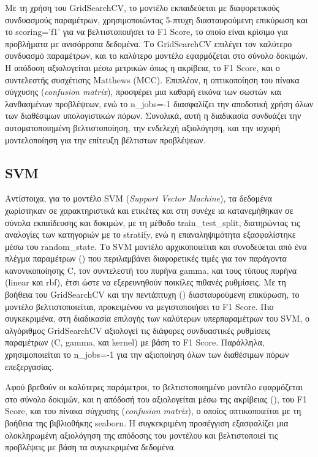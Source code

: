 \documentclass[diploma]{softlab-thesis}
\begin{document}
\begin{enumerate}
\begin{enumerate}
Με τη χρήση του GridSearchCV, το μοντέλο εκπαιδεύεται με διαφορετικούς συνδυασμούς παραμέτρων, χρησιμοποιώντας 5-πτυχη διασταυρούμενη επικύρωση και το scoring='f1' για να βελτιστοποιήσει το F1 Score, το οποίο είναι κρίσιμο για προβλήματα με ανισόρροπα δεδομένα. Το GridSearchCV επιλέγει τον καλύτερο συνδυασμό παραμέτρων, και το καλύτερο μοντέλο εφαρμόζεται στο σύνολο δοκιμών. Η απόδοση αξιολογείται μέσω μετρικών όπως η ακρίβεια, το F1 Score, και ο συντελεστής συσχέτισης Matthews (MCC). Επιπλέον, η οπτικοποίηση του πίνακα σύγχυσης (\textit{confusion matrix}),  προσφέρει μια καθαρή εικόνα των σωστών και λανθασμένων προβλέψεων, ενώ το n\_jobs=-1 διασφαλίζει την αποδοτική χρήση όλων των διαθέσιμων υπολογιστικών πόρων. Συνολικά, αυτή η διαδικασία συνδυάζει την αυτοματοποιημένη βελτιστοποίηση, την ενδελεχή αξιολόγηση, και την ισχυρή μοντελοποίηση για την επίτευξη βέλτιστων προβλέψεων.

\subsection{SVM}

Αντίστοιχα, για το μοντέλο SVM (\textit{Support Vector Machine}), τα δεδομένα χωρίστηκαν σε χαρακτηριστικά και ετικέτες και στη συνέχε
ια κατανεμήθηκαν σε σύνολα εκπαίδευσης και δοκιμών, με τη μέθοδο train\_test\_split, διατηρώντας τις αναλογίες των κατηγοριών με το stratify, ενώ η επαναληψιμότητα εξασφαλίστηκε μέσω του random\_state. Το SVM μοντέλο αρχικοποιείται και συνοδεύεται από ένα πλέγμα παραμέτρων () που περιλαμβάνει διαφορετικές τιμές για τον παράγοντα κανονικοποίησης C, τον συντελεστή του πυρήνα gamma, και τους τύπους πυρήνα (linear και rbf), έτσι ώστε να εξερευνηθούν ποικίλες πιθανές ρυθμίσεις. Με τη βοήθεια του GridSearchCV και την πεντάπτυχη () διασταυρούμενη επικύρωση, το μοντέλο βελτιστοποιείται, προκειμένου να μεγιστοποιήσει το F1 Score. Πιο συγκεκριμένα, στη διαδικασία επιλογής των καλύτερων υπερπαραμέτρων του SVM, ο αλγόριθμος GridSearchCV αξιολογεί τις διάφορες συνδυαστικές ρυθμίσεις παραμέτρων (C, gamma, και kernel) με βάση το F1 Score. Παράλληλα, χρησιμοποιείται το n\_jobs=-1 για την αξιοποίηση όλων των διαθέσιμων πόρων επεξεργασίας. 

Αφού βρεθούν οι καλύτερες παράμετροι, το βελτιστοποιημένο μοντέλο εφαρμόζεται στο σύνολο δοκιμών, και η απόδοσή του αξιολογείται μέσω της ακρίβειας (), του F1 Score, και του πίνακα σύγχυσης (\textit{confusion matrix}), ο οποίος οπτικοποιείται με τη βοήθεια της βιβλιοθήκης seaborn. H συγκεκριμένη προσέγγιση εξασφαλίζει μια ολοκληρωμένη αξιολόγηση της απόδοσης του μοντέλου και βελτιστοποιεί τις προβλέψεις με βάση τα συγκεκριμένα δεδομένα.


\end{enumerate}
\end{enumerate}
\end{document}
